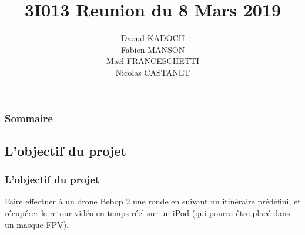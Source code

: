 \documentclass{beamer}
\title{3I013 Reunion du 8 Mars 2019}
\author{Daoud KADOCH\\Fabien MANSON\\Maël FRANCESCHETTI\\Nicolas CASTANET}
\begin{document}
	\begin{frame}
		\begin{center}
		\maketitle
		\end{center}
	\end{frame}
	\begin{frame}
		\begin{center}
		\frametitle{Sommaire}
		\tableofcontents{}
		\end{center}
	\end{frame}
	\begin{frame}
	\section{L'objectif du projet}
		\begin{center}
		\frametitle{L'objectif du projet}
		   Faire effectuer à un drone Bebop 2 une ronde en suivant un itinéraire prédéfini, et récupérer le retour vidéo en temps réel sur un iPod (qui pourra être placé dans un masque FPV).
		\end{center}
	\end{frame}
\end{document}
